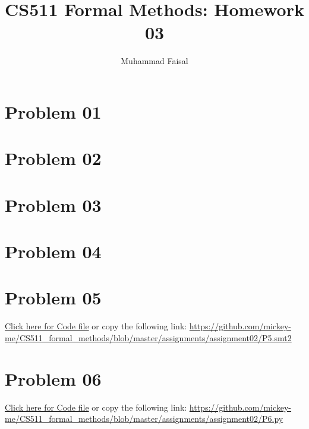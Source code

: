 \documentclass[11pt,leqno,fleqn]{article}
\title{CS511 Formal Methods: Homework 03}
\author{Muhammad Faisal}
\date{} %
\begin{document}
\maketitle

\section{Problem 01}


\section{Problem 02}


\section{Problem 03}


\section{Problem 04}


\section{Problem 05}
\href{https://github.com/mickey-me/CS511_formal_methods/blob/master/assignments/assignment02/P5.smt2}{Click here for Code file}
or copy the following link:
\url{https://github.com/mickey-me/CS511_formal_methods/blob/master/assignments/assignment02/P5.smt2}


\section{Problem 06}
\href{https://github.com/mickey-me/CS511_formal_methods/blob/master/assignments/assignment02/P6.py}{Click here for Code file}
or copy the following link:
\url{https://github.com/mickey-me/CS511_formal_methods/blob/master/assignments/assignment02/P6.py}
\end{document}
